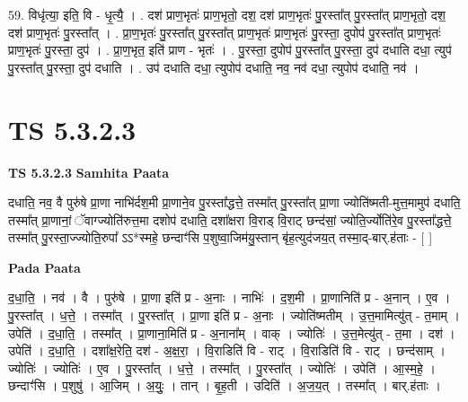 \documentclass[17pt]{extarticle}
\begin{document}
59. विधृ॑त्या॒ इति॒ वि - धृ॒त्यै॒ । . दश॑ प्राण॒भृतः॑ प्राण॒भृतो॒ दश॒ दश॑ प्राण॒भृतः॑ पु॒रस्ता᳚त् पु॒रस्ता᳚त् प्राण॒भृतो॒ दश॒ दश॑ प्राण॒भृतः॑ पु॒रस्ता᳚त् । . प्रा॒ण॒भृतः॑ पु॒रस्ता᳚त् पु॒रस्ता᳚त् प्राण॒भृतः॑ प्राण॒भृतः॑ पु॒रस्ता॒ दुपोप॑ पु॒रस्ता᳚त् प्राण॒भृतः॑ प्राण॒भृतः॑ पु॒रस्ता॒ दुप॑ । . प्रा॒ण॒भृत॒ इति॑ प्राण - भृतः॑ । . पु॒रस्ता॒ दुपोप॑ पु॒रस्ता᳚त् पु॒रस्ता॒ दुप॑ दधाति दधा॒ त्युप॑ पु॒रस्ता᳚त् पु॒रस्ता॒ दुप॑ दधाति । . उप॑ दधाति दधा॒ त्युपोप॑ दधाति॒ नव॒ नव॑ दधा॒ त्युपोप॑ दधाति॒ नव॑ । \newline
\pagebreak
{}

\section{ TS 5.3.2.3 }

\textbf{TS 5.3.2.3 } \newline
\textbf{Samhita Paata} \newline

दधाति॒ नव॒ वै पुरु॑षे प्रा॒णा नाभि॑र्दश॒मी प्रा॒णाने॒व पु॒रस्ता᳚द्धत्ते॒ तस्मा᳚त् पु॒रस्ता᳚त् प्रा॒णा ज्योति॑ष्मती-मुत्त॒मामुप॑ दधाति॒ तस्मा᳚त् प्रा॒णानां॒ ॅवाग्ज्योति॑रुत्त॒मा दशोप॑ दधाति॒ दशा᳚क्षरा वि॒राड् वि॒राट् छन्द॑सां॒ ज्योति॒र्ज्योति॑रे॒व पु॒रस्ता᳚द्धत्ते॒ तस्मा᳚त् पु॒रस्ता॒ज्ज्योति॒रुपा᳚ ऽऽ*स्महे॒ छन्दाꣳ॑सि प॒शुष्वा॒जिम॑यु॒स्तान् बृ॑ह॒त्युद॑जय॒त् तस्मा॒द्-बार्.ह॑ताः - [  ] \newline

\textbf{Pada Paata} \newline

द॒धा॒ति॒ । नव॑ । वै । पुरु॑षे । प्रा॒णा इति॑ प्र - अ॒नाः । नाभिः॑ । द॒श॒मी । प्रा॒णानिति॑ प्र - अ॒नान् । ए॒व । पु॒रस्ता᳚त् । ध॒त्ते॒ । तस्मा᳚त् । पु॒रस्ता᳚त् । प्रा॒णा इति॑ प्र - अ॒नाः । ज्योति॑ष्मतीम् । उ॒त्त॒मामित्यु॑त् - त॒माम् । उपेति॑ । द॒धा॒ति॒ । तस्मा᳚त् । प्रा॒णाना॒मिति॑ प्र - अ॒नाना᳚म् । वाक् । ज्योतिः॑ । उ॒त्त॒मेत्यु॑त् - त॒मा । दश॑ । उपेति॑ । द॒धा॒ति॒ । दशा᳚क्ष॒रेति॒ दश॑ - अ॒क्ष॒रा॒ । वि॒राडिति॑ वि - राट् । वि॒राडिति॑ वि - राट् । छन्द॑साम् । ज्योतिः॑ । ज्योतिः॑ । ए॒व । पु॒रस्ता᳚त् । ध॒त्ते॒ । तस्मा᳚त् । पु॒रस्ता᳚त् । ज्योतिः॑ । उपेति॑ । आ॒स्म॒हे॒ । छन्दाꣳ॑सि । प॒शुषु॑ । आ॒जिम् । अ॒युः॒ । तान् । बृ॒ह॒ती । उदिति॑ । अ॒ज॒य॒त् । तस्मा᳚त् । बार्.ह॑ताः ।  \newline
\end{document}
